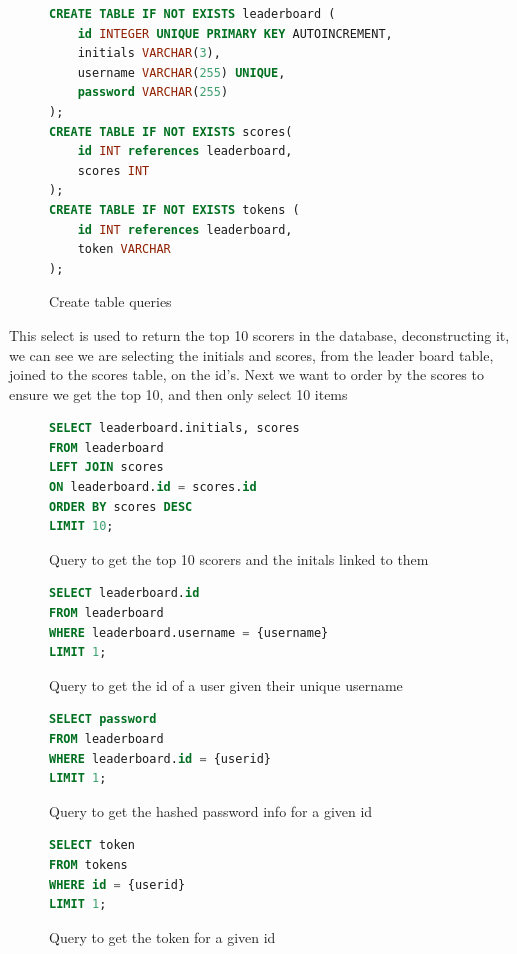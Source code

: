 \begin{figure}[H]
    \begin{lstlisting}[language=SQL, style=mystyle1]
CREATE TABLE IF NOT EXISTS leaderboard (
    id INTEGER UNIQUE PRIMARY KEY AUTOINCREMENT,
    initials VARCHAR(3),
    username VARCHAR(255) UNIQUE,
    password VARCHAR(255)
);
CREATE TABLE IF NOT EXISTS scores(
    id INT references leaderboard,
    scores INT
);
CREATE TABLE IF NOT EXISTS tokens (
    id INT references leaderboard,
    token VARCHAR
);
    \end{lstlisting}
      \centering
      \caption{Create table queries}
      \label{fig:SQL1}
\end{figure}

This select is used to return the top 10 scorers in the database, deconstructing it, we can see we are selecting the initials and scores, from the leader board table, joined to the scores table, on the id's. Next we want to order by the scores to ensure we get the top 10, and then only select 10 items
\begin{figure}[H]
    \begin{lstlisting}[language=SQL, style=mystyle1]
SELECT leaderboard.initials, scores
FROM leaderboard
LEFT JOIN scores
ON leaderboard.id = scores.id
ORDER BY scores DESC
LIMIT 10;
    \end{lstlisting}
      \centering
      \caption{Query to get the top 10 scorers and the initals linked to them}
      \label{fig:SQL2}
\end{figure}


\begin{figure}[H]
    \begin{lstlisting}[language=SQL, style=mystyle1]
SELECT leaderboard.id
FROM leaderboard
WHERE leaderboard.username = {username}
LIMIT 1;
    \end{lstlisting}
      \centering
      \caption{Query to get the id of a user given their unique username}
      \label{fig:SQL3}
\end{figure}

\begin{figure}[H]
    \begin{lstlisting}[language=SQL, style=mystyle1]
SELECT password
FROM leaderboard
WHERE leaderboard.id = {userid}
LIMIT 1;
    \end{lstlisting}
      \centering
      \caption{Query to get the hashed password info for a given id}
      \label{fig:SQL4}
\end{figure}

\begin{figure}[H]
    \begin{lstlisting}[language=SQL, style=mystyle1]
SELECT token
FROM tokens
WHERE id = {userid}
LIMIT 1;
    \end{lstlisting}
      \centering
      \caption{Query to get the token for a given id}
      \label{fig:SQL5}
\end{figure}

